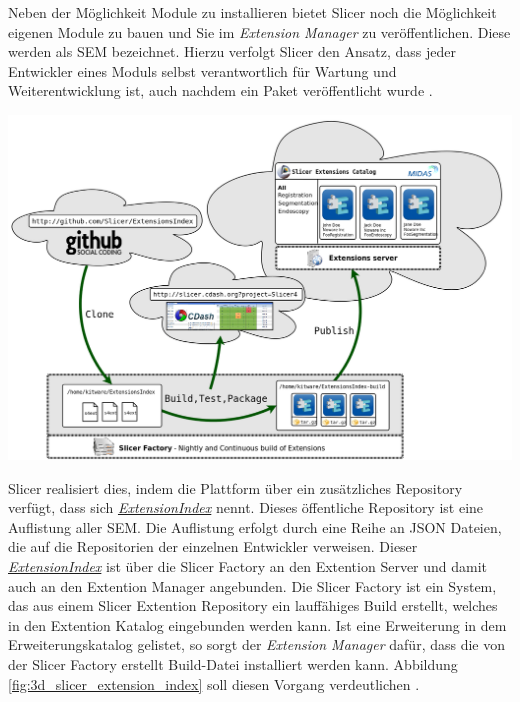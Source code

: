 \begin{minipage}{0.30\textwidth}
	Neben der Möglichkeit Module zu installieren bietet Slicer noch die Möglichkeit
	eigenen Module zu bauen und Sie im \textit{Extension Manager} zu
	veröffentlichen. Diese werden als \ac{SEM} bezeichnet. Hierzu verfolgt Slicer den
	Ansatz, dass jeder Entwickler eines Moduls selbst verantwortlich für Wartung
	und Weiterentwicklung ist, auch nachdem ein Paket veröffentlicht wurde \citep[vgl.][]{slicer2024}.
\end{minipage}
\hfill
\begin{minipage}{0.60\textwidth}
	\centering
	\includegraphics[width=1\textwidth]{img/slicer_extention_index.png}
	\label{fig:3d_slicer_extension_index}
\end{minipage}

Slicer realisiert dies, indem die Plattform über ein zusätzliches Repository verfügt,
dass sich
\href{https://github.com/Slicer/ExtensionsIndex?tab=readme-ov-file}{\textit{ExtensionIndex}}
nennt. Dieses öffentliche Repository ist eine Auflistung aller \ac{SEM}. Die Auflistung
erfolgt durch eine Reihe an \ac{JSON} Dateien, die auf die Repositorien der einzelnen
Entwickler verweisen. Dieser
\href{https://github.com/Slicer/ExtensionsIndex?tab=readme-ov-file}{\textit{ExtensionIndex}}
ist über die Slicer Factory an den Extention Server und damit auch an den
Extention Manager angebunden. Die Slicer Factory ist ein System, das aus einem
Slicer Extention Repository ein lauffähiges Build erstellt, welches in den Extention
Katalog eingebunden werden kann. Ist eine Erweiterung in dem Erweiterungskatalog
gelistet, so sorgt der \textit{Extension Manager} dafür, dass die von der Slicer
Factory erstellt Build-Datei installiert werden kann. Abbildung
\ref{fig:3d_slicer_extension_index} soll diesen Vorgang verdeutlichen \citep[vgl.][]{slicer2024}.

